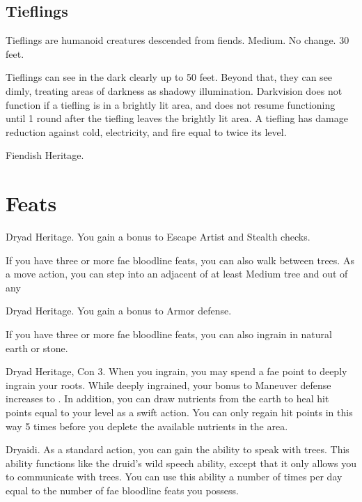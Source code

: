 \subsection{Tieflings}

Tieflings are humanoid creatures descended from fiends.
 Medium.
 No change.
 30 feet.
\begin{itemize}
     Tieflings can see in the dark clearly up to 50 feet. Beyond that, they can see dimly, treating areas of darkness as shadowy illumination. Darkvision does not function if a tiefling is in a brightly lit area, and does not resume functioning until 1 round after the tiefling leaves the brightly lit area.
     A tiefling has damage reduction against cold, electricity, and fire equal to twice its level.
\end{itemize}
 Fiendish Heritage.

\section{Feats}

\featpre Dryad Heritage.
\featben You gain a  bonus to Escape Artist and Stealth checks.

If you have three or more fae bloodline feats, you can also walk between trees. As a move action, you can step into an adjacent of at least Medium tree and out of any 

\featpre Dryad Heritage.
\featben You gain a  bonus to Armor defense.

If you have three or more fae bloodline feats, you can also ingrain in natural earth or stone.

\featpres Dryad Heritage, Con 3.
\featben When you ingrain, you may spend a fae point to deeply ingrain your roots. While deeply ingrained, your bonus to Maneuver defense increases to . In addition, you can draw nutrients from the earth to heal hit points equal to your level as a swift action. You can only regain hit points in this way 5 times before you deplete the available nutrients in the area. 

\featpre Dryaidi.
\featben As a standard action, you can gain the ability to speak with trees. This ability functions like the druid's wild speech ability, except that it only allows you to communicate with trees. You can use this ability a number of times per day equal to the number of fae bloodline feats you possess.

